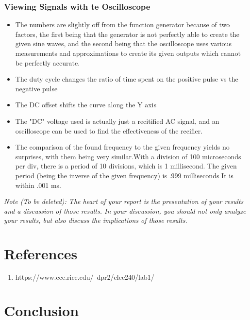 \documentclass[10pt]{article}
\begin{document}
	\subsubsection{Viewing Signals with te Oscilloscope}
	\begin{itemize}
	\item The numbers are slightly off from the function generator because of two factors, the first being that the generator is not perfectly able to create the given sine waves, and the second being that the oscilloscope uses various measurements and approximations to create its given outputs which cannot be perfectly accurate.
	\item The duty cycle changes the ratio of time spent on the positive pulse vs the negative pulse
	\item The DC offset shifts the curve along the Y axis
	\item The "DC" voltage used is actually just a recitified AC signal, and an oscilloscope can be used to find the effectiveness of the recifier.
	\item The comparison of the found frequency to the given frequency yields no surprises, with them being very similar.With a division of 100 microseconds per div, there is a period of 10 divisions, which is 1 millisecond. The given period (being the inverse of the given frequency) is .999 milliseconds It is within .001 ms.

	\end{itemize}

	\medskip
	
	\textit{Note (To be deleted): The heart of your report is the presentation of your results and a discussion of those results. In your discussion, you should not only analyze your results, but also discuss the implications of those results.}
	
	\section{References}
	
	\begin{enumerate}
		\item https://www.ece.rice.edu/~dpr2/elec240/lab1/
	\end{enumerate}
	
	\medskip
	
	
	
	\section{Conclusion}
	
\end{document}
